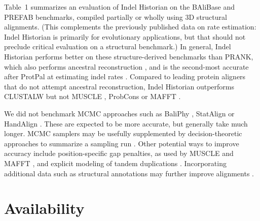 \documentclass{bioinfo}
\begin{document}
Table~1 summarizes an evaluation of Indel Historian
on the BAliBase and PREFAB benchmarks,
compiled partially or wholly using 3D structural alignments.
(This complements the previously published data on rate estimation:
Indel Historian is primarily for evolutionary applications,
but that should not preclude critical evaluation on a structural benchmark.)
In general, Indel Historian performs better on these structure-derived benchmarks than PRANK,
which also performs ancestral reconstruction \citep{LoytynojaGoldman2008},
and is the second-most accurate after ProtPal at estimating indel rates \citep{Westesson2012-zg}.
Compared to leading protein aligners that do not attempt ancestral reconstruction,
Indel Historian outperforms CLUSTALW \citep{LarkinEtAl2007} but not MUSCLE \citep{Edgar2004b},
ProbCons \citep{DoEtAl2005} or MAFFT \citep{KatohEtAl2005}.

We did not benchmark MCMC approaches
such as BaliPhy \citep{Redelings2014}, StatAlign \citep{NovakEtAl2008} or HandAlign \citep{WestessonBarquistHolmes2012}.
These are expected to be more accurate, but generally take much longer.
MCMC samplers may be usefully supplemented by decision-theoretic approaches to summarize a sampling run \citep{HermanEtAl2015}.
Other potential ways to improve accuracy include position-specific gap penalties, as used by MUSCLE \citep{Edgar2004b} and MAFFT \citep{KatohEtAl2005},
and explicit modeling of tandem duplications \citep{SzalkowskiAnisimova2013}.
Incorporating additional data such as structural annotations may further improve alignments \citep{HermanEtAl2014}.

% 
% 
% 



\section{Availability}
\end{document}
